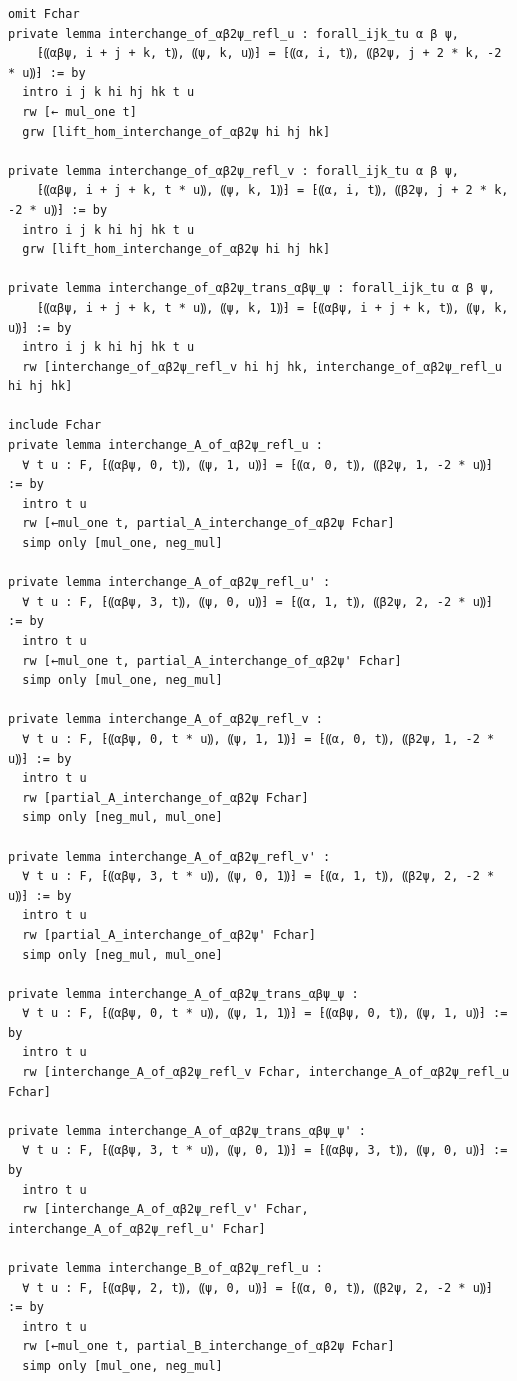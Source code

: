 \documentclass[10pt,a4paper]{article}
\begin{document}
\begin{Verbatim}
omit Fchar
private lemma interchange_of_αβ2ψ_refl_u : forall_ijk_tu α β ψ,
    ⁅⸨αβψ, i + j + k, t⸩, ⸨ψ, k, u⸩⁆ = ⁅⸨α, i, t⸩, ⸨β2ψ, j + 2 * k, -2 * u⸩⁆ := by
  intro i j k hi hj hk t u
  rw [← mul_one t]
  grw [lift_hom_interchange_of_αβ2ψ hi hj hk]

private lemma interchange_of_αβ2ψ_refl_v : forall_ijk_tu α β ψ,
    ⁅⸨αβψ, i + j + k, t * u⸩, ⸨ψ, k, 1⸩⁆ = ⁅⸨α, i, t⸩, ⸨β2ψ, j + 2 * k, -2 * u⸩⁆ := by
  intro i j k hi hj hk t u
  grw [lift_hom_interchange_of_αβ2ψ hi hj hk]

private lemma interchange_of_αβ2ψ_trans_αβψ_ψ : forall_ijk_tu α β ψ,
    ⁅⸨αβψ, i + j + k, t * u⸩, ⸨ψ, k, 1⸩⁆ = ⁅⸨αβψ, i + j + k, t⸩, ⸨ψ, k, u⸩⁆ := by
  intro i j k hi hj hk t u
  rw [interchange_of_αβ2ψ_refl_v hi hj hk, interchange_of_αβ2ψ_refl_u hi hj hk]

include Fchar
private lemma interchange_A_of_αβ2ψ_refl_u :
  ∀ t u : F, ⁅⸨αβψ, 0, t⸩, ⸨ψ, 1, u⸩⁆ = ⁅⸨α, 0, t⸩, ⸨β2ψ, 1, -2 * u⸩⁆ := by
  intro t u
  rw [←mul_one t, partial_A_interchange_of_αβ2ψ Fchar]
  simp only [mul_one, neg_mul]

private lemma interchange_A_of_αβ2ψ_refl_u' :
  ∀ t u : F, ⁅⸨αβψ, 3, t⸩, ⸨ψ, 0, u⸩⁆ = ⁅⸨α, 1, t⸩, ⸨β2ψ, 2, -2 * u⸩⁆ := by
  intro t u
  rw [←mul_one t, partial_A_interchange_of_αβ2ψ' Fchar]
  simp only [mul_one, neg_mul]

private lemma interchange_A_of_αβ2ψ_refl_v :
  ∀ t u : F, ⁅⸨αβψ, 0, t * u⸩, ⸨ψ, 1, 1⸩⁆ = ⁅⸨α, 0, t⸩, ⸨β2ψ, 1, -2 * u⸩⁆ := by
  intro t u
  rw [partial_A_interchange_of_αβ2ψ Fchar]
  simp only [neg_mul, mul_one]

private lemma interchange_A_of_αβ2ψ_refl_v' :
  ∀ t u : F, ⁅⸨αβψ, 3, t * u⸩, ⸨ψ, 0, 1⸩⁆ = ⁅⸨α, 1, t⸩, ⸨β2ψ, 2, -2 * u⸩⁆ := by
  intro t u
  rw [partial_A_interchange_of_αβ2ψ' Fchar]
  simp only [neg_mul, mul_one]

private lemma interchange_A_of_αβ2ψ_trans_αβψ_ψ :
  ∀ t u : F, ⁅⸨αβψ, 0, t * u⸩, ⸨ψ, 1, 1⸩⁆ = ⁅⸨αβψ, 0, t⸩, ⸨ψ, 1, u⸩⁆ := by
  intro t u
  rw [interchange_A_of_αβ2ψ_refl_v Fchar, interchange_A_of_αβ2ψ_refl_u Fchar]

private lemma interchange_A_of_αβ2ψ_trans_αβψ_ψ' :
  ∀ t u : F, ⁅⸨αβψ, 3, t * u⸩, ⸨ψ, 0, 1⸩⁆ = ⁅⸨αβψ, 3, t⸩, ⸨ψ, 0, u⸩⁆ := by
  intro t u
  rw [interchange_A_of_αβ2ψ_refl_v' Fchar, interchange_A_of_αβ2ψ_refl_u' Fchar]

private lemma interchange_B_of_αβ2ψ_refl_u :
  ∀ t u : F, ⁅⸨αβψ, 2, t⸩, ⸨ψ, 0, u⸩⁆ = ⁅⸨α, 0, t⸩, ⸨β2ψ, 2, -2 * u⸩⁆ := by
  intro t u
  rw [←mul_one t, partial_B_interchange_of_αβ2ψ Fchar]
  simp only [mul_one, neg_mul]


\end{Verbatim}
\end{document}
